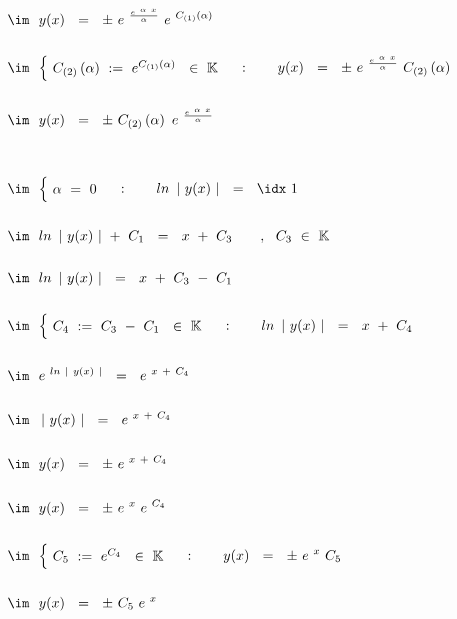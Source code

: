 \begin{enumerate}[leftmargin=*, labelsep=2em, itemsep=3em, label=\alph*)]
	\newpage
	
	$\begin{aligned}[t]
		&\im ~~ y(x) ~~ = ~~ \pm ~ e^{~ \frac{ e^{~ \alpha ~ x} }{ \alpha } } ~ e^{ ~ C_{(1)} \left( \alpha \right) } \\ \\
		&\im ~~ {\begin{cases}
			~ C_{(2)} \left( \alpha \right) ~ := ~ e^{ C_{(1)} \left( \alpha \right) } ~~ \in ~ \mathbb{K} ~
		\end{cases}} : \qquad y(x) ~~ = ~~ \pm ~ e^{~ \frac{ e^{~ \alpha ~ x} }{ \alpha } } ~ C_{(2)} \left( \alpha \right) \\ \\
		&\im ~~ y(x) ~~ = ~~ \pm ~  C_{(2)} \left( \alpha \right) ~ e^{~ \frac{ e^{~ \alpha ~ x} }{ \alpha } } \\ \\ \\ %
		&\im ~~ {\begin{cases}
			~ \alpha ~ = ~ 0 ~
		\end{cases}} : \qquad ln ~ \left| ~ y(x) ~ \right| ~~ = ~~ \idx ~ 1 \\ \\
		&\im ~~ ln ~ \left| ~ y(x) ~ \right| ~ + ~ C_1 ~~ = ~~ x ~ + ~ C_3 \qquad, ~~ C_3 ~ \in ~ \mathbb{K} \\ \\
		&\im ~~ ln ~ \left| ~ y(x) ~ \right| ~~ = ~~ x ~ + ~ C_3 ~ - ~ C_1 \\ \\
		&\im ~~ {\begin{cases}
			~ C_4 ~ := ~ C_3 ~ - ~ C_1 ~~ \in ~ \mathbb{K} ~
		\end{cases}} : \qquad ln ~ \left| ~ y(x) ~ \right| ~~ = ~~ x ~ + ~ C_4 \\ \\
		&\im ~~ e^{~ ln ~ \left| ~ y(x) ~ \right|} ~~ = ~~ e^{~ x ~ + ~ C_4} \\ \\
		&\im ~~ \left| ~ y(x) ~ \right| ~~ = ~~ e^{~ x ~ + ~ C_4} \\ \\
		&\im ~~ y(x) ~~ = ~~ \pm ~ e^{~ x ~ + ~ C_4} \\ \\
		&\im ~~ y(x) ~~ = ~~ \pm ~ e^{~ x} ~ e^{~ C_4} \\ \\
		&\im ~~ {\begin{cases}
			~ C_5 ~ := ~ e^{C_4} ~~ \in ~ \mathbb{K} ~
		\end{cases}} : \qquad y(x) ~~ = ~~ \pm ~ e^{~ x} ~ C_5 \\ \\
		&\im ~~ y(x) ~~ = ~~ \pm ~ C_5 ~ e^{~ x} \\ \\
	\end{aligned}$
	

\end{enumerate}
